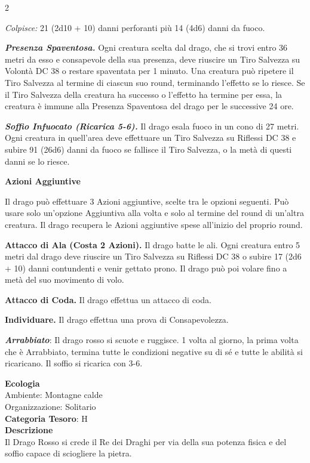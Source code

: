 \begin{multicols}{2}
{\emph{Colpisce:} 21 (2d10 + 10) danni perforanti più 14 (4d6) danni da fuoco.

\emph{\textbf{Presenza Spaventosa.}} Ogni creatura scelta dal drago, che si trovi entro 36 metri da esso e consapevole della sua presenza, deve riuscire un Tiro Salvezza su Volontà DC 38 o restare spaventata per 1 minuto. Una creatura può ripetere il Tiro Salvezza al termine di ciascun suo round, terminando l'effetto se lo riesce. Se il Tiro Salvezza della creatura ha successo o l'effetto ha termine per essa, la creatura è immune alla Presenza Spaventosa del drago per le successive 24 ore.

\emph{\textbf{Soffio Infuocato (Ricarica 5-6).}} Il drago esala fuoco in un cono di 27 metri. Ogni creatura in quell'area deve effettuare un Tiro Salvezza su Riflessi DC 38 e subire 91 (26d6) danni da fuoco se fallisce il Tiro Salvezza, o la metà di questi danni se lo riesce.

\textbf{Azioni Aggiuntive}

Il drago può effettuare 3 Azioni aggiuntive, scelte tra le opzioni seguenti. Può usare solo un'opzione Aggiuntiva alla volta e solo al termine del round di un'altra creatura. Il drago recupera le Azioni aggiuntive spese all'inizio del proprio round.

\textbf{Attacco di Ala (Costa 2 Azioni).} Il drago batte le ali. Ogni creatura entro 5 metri dal drago deve riuscire un Tiro Salvezza su Riflessi DC 38 o subire 17 (2d6 + 10) danni contundenti e venir gettato prono. Il drago può poi volare fino a metà del suo movimento di volo.

\textbf{Attacco di Coda.} Il drago effettua un attacco di coda.

\textbf{Individuare.} Il drago effettua una prova di Consapevolezza.

\emph{\textbf{Arrabbiato}}: Il drago rosso si scuote e ruggisce. 1 volta al giorno, la prima volta che è Arrabbiato, termina tutte le condizioni negative su di sé e tutte le abilità si ricaricano. Il soffio si ricarica con 3-6.

\textbf{Ecologia}\\
Ambiente: Montagne calde\\
Organizzazione: Solitario\\
\textbf{Categoria Tesoro}: H\\
\textbf{Descrizione}\\
Il Drago Rosso si crede il Re dei Draghi per via della sua potenza fisica e del soffio capace di sciogliere la pietra.

}
\end{multicols}
